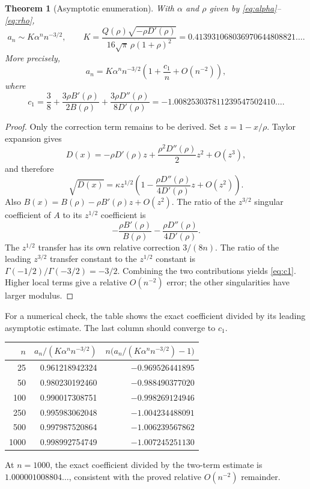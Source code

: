 \documentclass[11pt,a4paper]{article}
\newtheorem{theorem}{Theorem}[section]
\theoremstyle{definition}
\theoremstyle{remark}
\begin{document}
\begin{theorem}[Asymptotic enumeration]\label{thm:asymptotic}
With $\alpha$ and $\rho$ given by \eqref{eq:alpha}--\eqref{eq:rho},
\begin{equation}\label{eq:asymp}
 \boxed{\displaystyle a_n\sim K\alpha^n n^{-3/2},\qquad
 K=\frac{Q(\rho)\sqrt{-\rho D'(\rho)}}
         {16\sqrt\pi\,\rho(1+\rho)^2}
   =0.413931068036970644808821\ldots.}
\end{equation}
More precisely,
\begin{equation}\label{eq:asymp2}
 a_n=K\alpha^n n^{-3/2}\left(1+\frac{c_1}{n}+O(n^{-2})\right),
\end{equation}
where
\begin{equation}\label{eq:c1}
 c_1=\frac38+\frac{3\rho B'(\rho)}{2B(\rho)}
              +\frac{3\rho D''(\rho)}{8D'(\rho)}
     =-1.008253037811239547502410\ldots.
\end{equation}
\end{theorem}

\begin{proof}
Only the correction term remains to be derived. Set $z=1-x/\rho$.
Taylor expansion gives
\[
 D(x)=-\rho D'(\rho)z+\frac{\rho^2D''(\rho)}2z^2+O(z^3),
\]
and therefore
\[
 \sqrt{D(x)}=\kappa z^{1/2}
 \left(1-\frac{\rho D''(\rho)}{4D'(\rho)}z+O(z^2)\right).
\]
Also $B(x)=B(\rho)-\rho B'(\rho)z+O(z^2)$. The ratio of the
$z^{3/2}$ singular coefficient of $A$ to its $z^{1/2}$ coefficient is
\[
 -\frac{\rho B'(\rho)}{B(\rho)}-
  \frac{\rho D''(\rho)}{4D'(\rho)}.
\]
The $z^{1/2}$ transfer has its own relative correction $3/(8n)$.
The ratio of the leading $z^{3/2}$ transfer constant to the $z^{1/2}$
constant is $\Gamma(-1/2)/\Gamma(-3/2)=-3/2$. Combining the two
contributions yields \eqref{eq:c1}. Higher local terms give a relative
$O(n^{-2})$ error; the other singularities have larger modulus.
\end{proof}

For a numerical check, the table shows the exact coefficient divided by
its leading asymptotic estimate. The last column should converge to $c_1$.
\begin{center}
\begin{tabular}{r r r}
\toprule
$n$ & $a_n/(K\alpha^n n^{-3/2})$ & $n\bigl(a_n/(K\alpha^n n^{-3/2})-1\bigr)$\\
\midrule
25 & 0.961218942324 & $-0.969526441895$\\
50 & 0.980230192460 & $-0.988490377020$\\
100 & 0.990017308751 & $-0.998269124946$\\
250 & 0.995983062048 & $-1.004234488091$\\
500 & 0.997987520864 & $-1.006239567862$\\
1000 & 0.998992754749 & $-1.007245251130$\\
\bottomrule
\end{tabular}
\end{center}
At $n=1000$, the exact coefficient divided by the two-term estimate is
$1.000001008804\ldots$, consistent with the proved relative $O(n^{-2})$
remainder.
\end{document}
